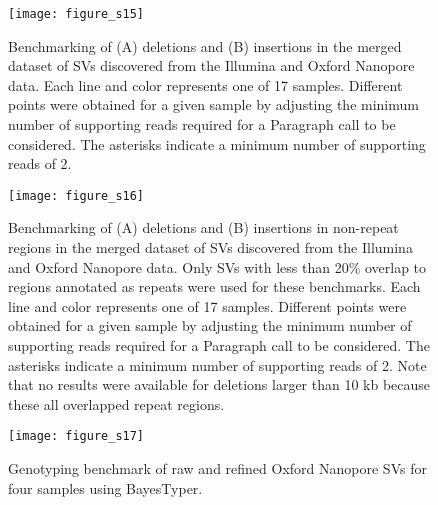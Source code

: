 \documentclass[12pt]{article}
\newenvironment{lsfigure}
	{\begin{landscape} \begin{figure} \centering}
	{\end{figure} \end{landscape}}
\begin{document}
\clearpage%

\begin{lsfigure}
	\texttt{[image: figure\_s15]}

	\caption[Joint Illumina/Oxford Nanopore deletion and insertion benchmarks]{
		Benchmarking of (A) deletions and (B) insertions in the merged dataset of SVs discovered from the Illumina and Oxford Nanopore data.
			Each line and color represents one of 17 samples. 
			Different points were obtained for a given sample by adjusting the minimum number of supporting reads required for a Paragraph call to be considered. 
			The asterisks indicate a minimum number of supporting reads of 2.
	}

	\label{fig_s15}
\end{lsfigure}

\clearpage%

\begin{lsfigure}
	\texttt{[image: figure\_s16]}

	\caption[Joint Illumina/Oxford Nanopore deletion and insertion benchmarks in non-repeat regions]{
		Benchmarking of (A) deletions and (B) insertions in non-repeat regions in the merged dataset of SVs discovered from the Illumina and Oxford Nanopore data. 
		Only SVs with less than 20\% overlap to regions annotated as repeats were used for these benchmarks. 
		Each line and color represents one of 17 samples. 
		Different points were obtained for a given sample by adjusting the minimum number of supporting reads required for a Paragraph call to be considered. 
		The asterisks indicate a minimum number of supporting reads of 2.
		Note that no results were available for deletions larger than 10 kb because these all overlapped repeat regions.
	}

	\label{fig_s16}
\end{lsfigure}

\clearpage%

\begin{lsfigure}
	\texttt{[image: figure\_s17]}

	\caption{Genotyping benchmark of raw and refined Oxford Nanopore SVs for four samples using BayesTyper.}

	\label{fig_s17}

\end{lsfigure}
\end{document}
